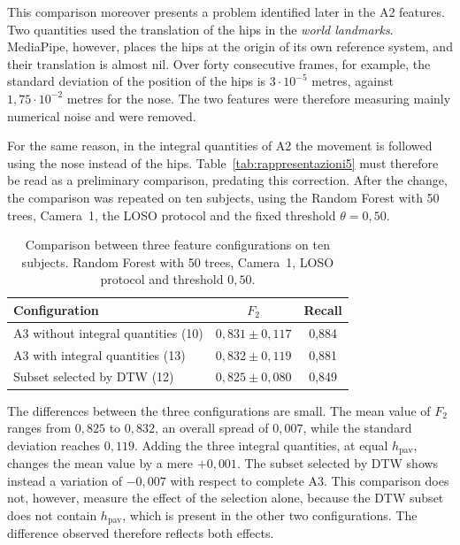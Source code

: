 This comparison moreover presents a problem identified later in the A2 features. Two quantities used the translation of the hips in the \emph{world landmarks}. MediaPipe, however, places the hips at the origin of its own reference system, and their translation is almost nil.
Over forty consecutive frames, for example, the standard deviation of the position of the hips is $3\cdot10^{-5}$ metres, against $1{,}75\cdot10^{-2}$ metres for the nose. The two features were therefore measuring mainly numerical noise and were removed.

For the same reason, in the integral quantities of A2 the movement is followed using the nose instead of the hips. Table~\ref{tab:rappresentazioni5} must therefore be read as a preliminary comparison, predating this correction. After the change, the comparison was repeated on ten subjects, using the Random Forest with 50 trees, Camera~1, the LOSO protocol and the fixed threshold $\theta=0{,}50$.

\begin{table}[htbp]
\centering
\caption{Comparison between three feature configurations on ten subjects. Random Forest with 50 trees, Camera~1, LOSO protocol and threshold $0{,}50$.} \label{tab:rappresentazioni10}
\begin{tabular}{lcc}
\toprule
\textbf{Configuration} & \textbf{$F_2$} & \textbf{Recall} \\
\midrule
A3 without integral quantities (10) & $0{,}831 \pm 0{,}117$ & 0,884 \\
A3 with integral quantities (13) & $0{,}832 \pm 0{,}119$ & 0,881 \\
Subset selected by DTW (12) & $0{,}825 \pm 0{,}080$ & 0,849 \\ \bottomrule
\end{tabular}
\end{table}

The differences between the three configurations are small. The mean value of $F_2$ ranges from $0{,}825$ to $0{,}832$, an overall spread of $0{,}007$, while the standard deviation reaches $0{,}119$. Adding the three integral quantities, at equal $h_{\text{pav}}$, changes the mean value by a mere $+0{,}001$. The subset selected by DTW shows instead a variation of $-0{,}007$ with respect to complete A3. This comparison does not, however, measure the effect of the selection alone, because the DTW subset does not contain $h_{\text{pav}}$, which is present in the other two configurations. The difference observed therefore reflects both effects.

